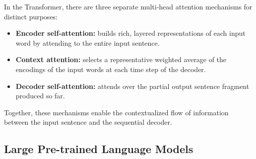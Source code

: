 In the Transformer, there are three separate multi-head attention mechanisms for
distinct purposes:
\begin{itemize}
  \item \textbf{Encoder self-attention:} builds rich, layered representations of
        each input word by attending to the entire input sentence.
  \item \textbf{Context attention:} selects
        a representative weighted average of the encodings of the input words at each
        time step of the decoder.
  \item \textbf{Decoder self-attention:} attends over the partial output sentence
        fragment produced so far.
\end{itemize}
Together, these mechanisms enable the contextualized flow of information between
the input sentence and the sequential decoder.

\subsection{Large Pre-trained Language Models}
